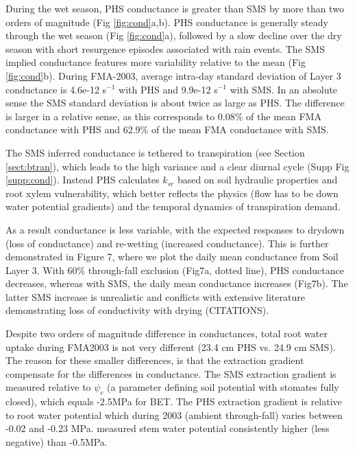 \documentclass[draft,linenumbers]{agujournal}
\begin{document}
    During the wet season, PHS conductance is greater than SMS by more than two orders of magnitude (Fig \ref{fig:cond}a,b). PHS conductance is generally steady through the wet season (Fig \ref{fig:cond}a), followed by a slow decline over the dry season with short resurgence episodes associated with rain events. The SMS implied conductance features more variability relative to the mean (Fig \ref{fig:cond}b). During FMA-2003, average intra-day standard deviation of Layer 3 conductance is 4.6e-12 s$^{-1}$ with PHS and 9.9e-12 s$^{-1}$ with SMS. In an absolute sense the SMS standard deviation is about twice as large as PHS. The difference is larger in a relative sense, as this corresponds to 0.08\% of the mean FMA conductance with PHS and 62.9\% of the mean FMA conductance with SMS.
    
    The SMS inferred conductance is tethered to transpiration (see Section \ref{sect:btran}), 
    which leads to the high variance and a clear diurnal cycle (Supp Fig \ref{supp:cond}). 
    Instead PHS calculates $k_{sr}$ based on soil hydraulic properties and root xylem vulnerability, which better reflects the physics (flow has to be down water potential gradients) and the temporal dynamics of transpiration demand.
    
    As a result conductance is less variable, with the expected responses to drydown (loss of conductance) and re-wetting (increased conductance). This is further demonstrated in Figure 7, where we plot the daily mean conductance from Soil Layer 3. With 60\% through-fall exclusion (Fig7a, dotted line), PHS conductance decreases, whereas with SMS, the daily mean conductance increases (Fig7b). The latter SMS increase is unrealistic and conflicts with extensive literature demonstrating loss of conductivity with drying (CITATIONS).
    
    Despite two orders of magnitude difference in conductances, total root water uptake during FMA2003 is not very different (23.4 cm PHS vs. 24.9 cm SMS). The reason for these smaller differences, is that the extraction gradient compensate for the differences in conductance. The SMS extraction gradient is measured relative to $\psi_c$ (a parameter defining soil potential with stomates fully closed), which equals -2.5MPa for BET. The PHS extraction gradient is relative to root water potential which during 2003 (ambient through-fall) varies between -0.02 and -0.23 MPa. \citet{fisher2006} measured stem water potential consistently higher (less negative) than -0.5MPa.
    
\end{document}

